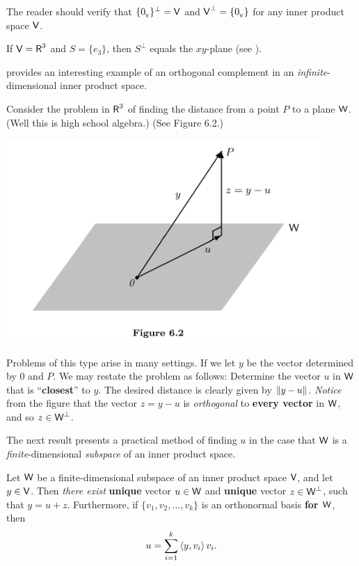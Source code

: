 \begin{example} \label{example 6.2.8}
The reader should verify that \(\{ 0_{_{\textsf{V}}} \}^{\perp} = \textsf{V}\) and \(\textsf{V}^{\perp} = \{ 0_{_{\textsf{V}}} \}\) for any inner product space \(\textsf{V}\).
\end{example}

\begin{example} \label{example 6.2.9}
If \(\textsf{V} = \textsf{R}^3\) and \(S = \{ e_3 \}\), then \(S^{\perp}\) equals the \(xy\)-plane (see ).
\end{example}

 provides an interesting example of an orthogonal complement in an \emph{infinite}-dimensional inner product space. 
\begin{remark} \label{remark 6.2.7}
Consider the problem in \(\textsf{R}^3\) of finding the distance from a point \(P\) to a plane \(\textsf{W}\).
(Well this is high school algebra.)
(See Figure 6.2.)

\includegraphics[width=12cm]{images/figure-6-2.png}

Problems of this type arise in many settings.
If we let \(y\) be the vector determined by \(0\) and \(P\).
We may restate the problem as follows:
Determine the vector \(u\) in \(\textsf{W}\) that is ``\textbf{closest}'' to \(y\).
The desired distance is clearly given by \(\left\lVert y - u\right\rVert\).
\emph{Notice} from the figure that the vector \(z = y - u\) is \emph{orthogonal} to \textbf{every vector} in \(\textsf{W}\), and so \(z \in \textsf{W}^{\perp}\).

The next result presents a practical method of finding \(u\) in the case that \(\textsf{W}\) is a \emph{finite}-dimensional \emph{subspace} of an inner product space.
\end{remark}

\begin{theorem} \label{thm 6.6}
Let \(\textsf{W}\) be a finite-dimensional subspace of an inner product space \(\textsf{V}\), and let \(y \in \textsf{V}\).
Then \emph{there exist} \textbf{unique} vector \(u \in \textsf{W}\) and \textbf{unique} vector \(z \in \textsf{W}^{\perp}\), such that \(y = u + z\).
Furthermore, if \(\{ v_1, v_2, ..., v_k \}\) is an orthonormal basis \textbf{for \(\textsf{W}\)}, then
\[
    u = \sum_{i = 1}^k \left< y, v_i \right> v_i.
\]
\end{theorem}

